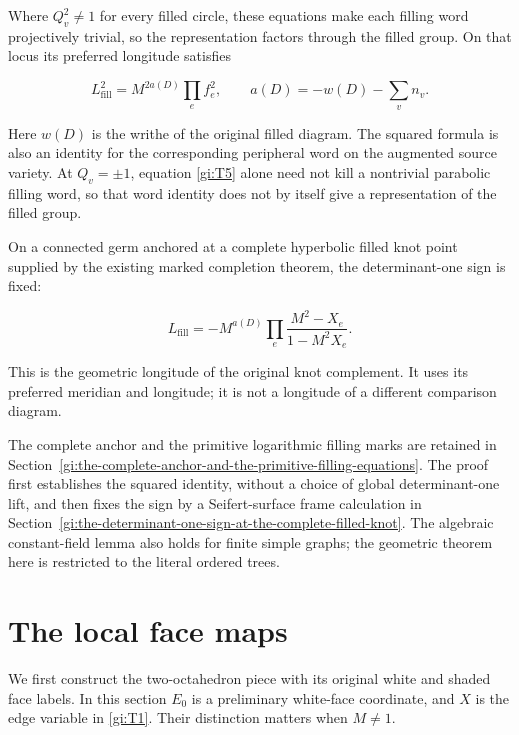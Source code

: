 Where \(Q_v^2\ne1\) for every filled circle, these equations make
each filling word projectively trivial, so the representation factors
through the filled group. On that locus its preferred longitude satisfies

\begin{equation}\label{gi:T6}
L_{\mathrm{fill}}^2=M^{2a(D)}\prod_e f_e^2,\qquad
                        a(D)=-w(D)-\sum_v n_v.
\end{equation}

Here \(w(D)\) is the writhe of the original filled diagram.
The squared formula is also an identity for the corresponding peripheral
word on the augmented source variety. At \(Q_v=\pm1\), equation \eqref{gi:T5}
alone need not kill a nontrivial parabolic filling word, so that word
identity does not by itself give a representation of the filled group.

On a connected germ anchored at a complete hyperbolic filled knot
point supplied by the existing marked completion theorem, the
determinant-one sign is fixed:

\begin{equation}\label{gi:T7}
\boxed{\displaystyle
       L_{\mathrm{fill}}
          =-M^{a(D)}\prod_e\frac{M^2-X_e}{1-M^2X_e}.}
\end{equation}

This is the geometric longitude of the original knot complement.
It uses its preferred meridian and longitude; it is not a longitude
of a different comparison diagram.

The complete anchor and the primitive logarithmic filling marks are
retained in Section~\ref{gi:the-complete-anchor-and-the-primitive-filling-equations}. The proof first establishes the squared
identity, without a choice of global determinant-one lift, and then
fixes the sign by a Seifert-surface frame calculation in Section~\ref{gi:the-determinant-one-sign-at-the-complete-filled-knot}.
The algebraic constant-field lemma also holds for finite simple graphs;
the geometric theorem here is restricted to the literal ordered trees.

\section{The local face maps}\label{gi:the-local-face-maps}

We first construct the two-octahedron piece with its original
white and shaded face labels. In this section \(E_0\) is a preliminary
white-face coordinate, and \(X\) is the edge variable in \eqref{gi:T1}.
Their distinction matters when \(M\ne1\).

